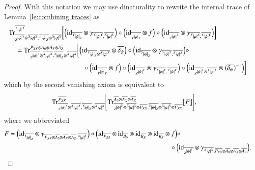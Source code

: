 \documentclass{amsart}
\def\tn{\textnormal}
\def\Trace{\tn{Tr}}
\def\ol{\overline}
\def\id{\tn{id}}
\newcommand{\feeddd}[3]{{\tensor*[^{#2}_{\color{white}{!}}]{{|#1|}}{^{#3}}}}%
\newcommand{\feeddc}[3]{{\tensor*[^{#2}]{{|#1|}}{_{#3}}}}
\newcommand{\feedcd}[3]{{\tensor*[_{#2}]{{|#1|}}{^{#3}}}}
\newcommand{\feedcc}[3]{{\tensor*[^{\color{white}{!}}_{#2}]{{|#1|}}{_{#3}}}}
\theoremstyle{remark}
\theoremstyle{definition}
\begin{document}
\begin{proof}
With this notation we may use dinaturality to rewrite the internal trace of Lemma~\ref{le:combining traces} as
\begin{align*}
&\Trace^{\ol{\feeddd{\psi}{Y}{Y}}}_{\ol{\feedcd{\psi}{Z}{Y}}\otimes\ol{\feeddd{\varphi}{X}{X}},\ol{\feeddc{\psi}{Y}{Z}}\otimes\ol{\feeddd{\varphi}{X}{X}}}
\bigg[
\Big(\id_{\ol{\feeddc{\psi}{Y}{Z}}}\otimes\gamma_{\ol{\feeddd{\psi}{Y}{Y}},\ol{\feeddd{\varphi}{X}{X}}}\Big)\circ\Big(\id_{\ol{\feedcc{\varphi}{Y}{Y}}}\otimes f\Big)\circ\Big(\id_{\ol{\feedcd{\psi}{Z}{Y}}}\otimes\gamma_{\ol{\feeddd{\varphi}{X}{X}},\ol{\feeddd{\psi}{Y}{Y}}}\Big)
\bigg]\\
&\quad=\Trace^{\ol{P_{XX}}\otimes\ol{A_0}\otimes\ol{A_X}\otimes\ol{A_Z}}_{\ol{\feedcd{\psi}{Z}{Y}}\otimes\ol{\feeddd{\varphi}{X}{X}},\ol{\feeddc{\psi}{Y}{Z}}\otimes\ol{\feeddd{\varphi}{X}{X}}}
\bigg[\Big(\id_{\ol{\feeddc{\psi}{Y}{Z}}\otimes\ol{\feeddd{\varphi}{X}{X}}}\otimes\ol{\delta_\psi}\Big)\circ \Big(\id_{\ol{\feeddc{\psi}{Y}{Z}}}\otimes\gamma_{\ol{\feeddd{\psi}{Y}{Y}},\ol{\feeddd{\varphi}{X}{X}}}\Big)\circ\\
&\hspace{1.5in}\circ\Big(\id_{\ol{\feedcc{\varphi}{Y}{Y}}}\otimes f\Big)\circ\Big(\id_{\ol{\feedcd{\psi}{Z}{Y}}}\otimes\gamma_{\ol{\feeddd{\varphi}{X}{X}},\ol{\feeddd{\psi}{Y}{Y}}}\Big)\circ\Big(\id_{\ol{\feedcd{\psi}{Z}{Y}}\otimes\ol{\feeddd{\varphi}{X}{X}}}\otimes(\ol{\delta_\psi})^{-1}\Big)\bigg]
\end{align*}
which by the second vanishing axiom is equivalent to
\begin{align}
\label{eq:trace1} &\Trace^{\ol{P_{XX}}}_{\ol{\feedcd{\psi}{Z}{Y}}\otimes\ol{\feeddd{\varphi}{X}{X}},\ol{\feeddc{\psi}{Y}{Z}}\otimes\ol{\feeddd{\varphi}{X}{X}}}
 \Bigg[\Trace^{\ol{A_0}\otimes\ol{A_X}\otimes\ol{A_Z}}_{\ol{\feedcd{\psi}{Z}{Y}}\otimes\ol{\feeddd{\varphi}{X}{X}}\otimes\ol{P_{XX}},\ol{\feeddc{\psi}{Y}{Z}}\otimes\ol{\feeddd{\varphi}{X}{X}}\otimes\ol{P_{XX}}}
\big[F\big]\Bigg],
\end{align}
where we abbreviated
\begin{align*}
&F=\Big(\id_{\ol{\feeddc{\psi}{Y}{Z}}}\otimes\gamma_{\ol{P_{XX}}\otimes\ol{A_0}\otimes\ol{A_X}\otimes\ol{A_Z},\ol{\feeddd{\varphi}{X}{X}}}\Big)\circ\Big(\id_{\ol{P_{ZZ}}}\otimes\id_{\ol{B_0}}\otimes\id_{\ol{B_X}}\otimes\id_{\ol{B_Z}}\otimes f\Big)\circ\\
&\hspace{3.5in}\circ\Big(\id_{\ol{\feedcd{\psi}{Z}{Y}}}\otimes\gamma_{\ol{\feeddd{\varphi}{X}{X}},\ol{P_{XX}}\otimes\ol{A_0}\otimes\ol{A_X}\otimes\ol{A_Z}}\Big).

\end{align*}
\end{proof}
\end{document}

